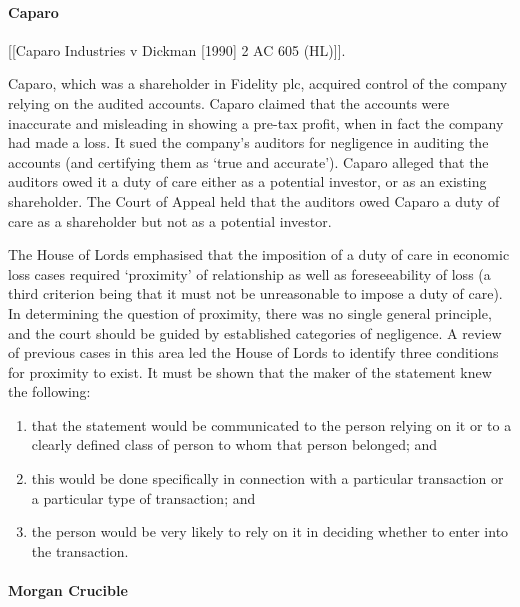 \documentclass[
]{article}
\providecommand{\tightlist}{%
  \setlength{\itemsep}{0pt}\setlength{\parskip}{0pt}}
\begin{document}
\hypertarget{caparo}{%
\paragraph{Caparo}\label{caparo}}

{[}{[}Caparo Industries v Dickman {[}1990{]} 2 AC 605 (HL){]}{]}.

Caparo, which was a shareholder in Fidelity plc, acquired control of the
company relying on the audited accounts. Caparo claimed that the
accounts were inaccurate and misleading in showing a pre-tax profit,
when in fact the company had made a loss. It sued the company's auditors
for negligence in auditing the accounts (and certifying them as `true
and accurate'). Caparo alleged that the auditors owed it a duty of care
either as a potential investor, or as an existing shareholder. The Court
of Appeal held that the auditors owed Caparo a duty of care as a
shareholder but not as a potential investor.

The House of Lords emphasised that the imposition of a duty of care in
economic loss cases required `proximity' of relationship as well as
foreseeability of loss (a third criterion being that it must not be
unreasonable to impose a duty of care). In determining the question of
proximity, there was no single general principle, and the court should
be guided by established categories of negligence. A review of previous
cases in this area led the House of Lords to identify three conditions
for proximity to exist. It must be shown that the maker of the statement
knew the following:

\begin{enumerate}
\def\labelenumi{\arabic{enumi}.}
\tightlist
\item
  that the statement would be communicated to the person relying on it
  or to a clearly defined class of person to whom that person belonged;
  and
\item
  this would be done specifically in connection with a particular
  transaction or a particular type of transaction; and
\item
  the person would be very likely to rely on it in deciding whether to
  enter into the transaction.
\end{enumerate}

\hypertarget{morgan-crucible}{%
\paragraph{Morgan Crucible}\label{morgan-crucible}}
\end{document}
